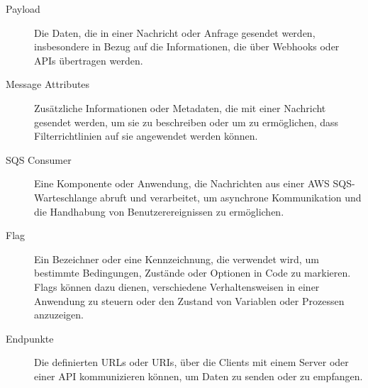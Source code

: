 \begin{description}
    \item[\hypertarget{Payload}{Payload}] Die Daten, die in einer Nachricht oder Anfrage gesendet werden, insbesondere in Bezug auf die Informationen, die über Webhooks oder APIs übertragen werden.
    \item[\hypertarget{MessageAttributes}{Message Attributes}] Zusätzliche Informationen oder Metadaten, die mit einer Nachricht gesendet werden, um sie zu beschreiben oder um zu ermöglichen, dass Filterrichtlinien auf sie angewendet werden können.
    \item[\hypertarget{SQSConsumer}{SQS Consumer}] Eine Komponente oder Anwendung, die Nachrichten aus einer AWS SQS-Warteschlange abruft und verarbeitet, um asynchrone Kommunikation und die Handhabung von Benutzerereignissen zu ermöglichen.
    \item[\hypertarget{Flag}{Flag}] Ein Bezeichner oder eine Kennzeichnung, die verwendet wird, um bestimmte Bedingungen, Zustände oder Optionen in Code zu markieren. Flags können dazu dienen, verschiedene Verhaltensweisen in einer Anwendung zu steuern oder den Zustand von Variablen oder Prozessen anzuzeigen.
    \item[\hypertarget{Endpoints}{Endpunkte}] Die definierten URLs oder URIs, über die Clients mit einem Server oder einer API kommunizieren können, um Daten zu senden oder zu empfangen.
\end{description}
